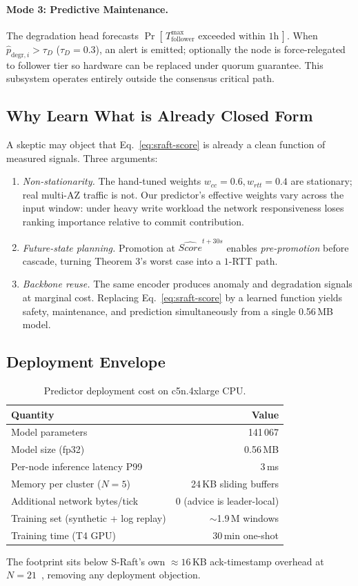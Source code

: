\paragraph{Mode 3: Predictive Maintenance.}
The degradation head forecasts $\Pr[\,T_{\mathrm{follower}}^{\max}\text{ exceeded within 1h}\,]$.
When $\widehat{p}_{\mathrm{degr},i}>\tau_D$ ($\tau_D=0.3$), an alert is
emitted; optionally the node is force-relegated to follower tier so
hardware can be replaced under quorum guarantee. This subsystem operates
entirely outside the consensus critical path.

\subsection{Why Learn What is Already Closed Form}

A skeptic may object that Eq.~\eqref{eq:sraft-score} is already a clean
function of measured signals. Three arguments:

\begin{enumerate}\setlength\itemsep{1pt}
\item[\textit{(i)}] \emph{Non-stationarity.} The hand-tuned weights
$w_{cc}=0.6, w_{rtt}=0.4$ are stationary; real multi-AZ traffic is not.
Our predictor's effective weights vary across the input window: under
heavy write workload the network responsiveness loses ranking importance
relative to commit contribution.
\item[\textit{(ii)}] \emph{Future-state planning.} Promotion at
$\widehat{Score}^{t+30s}$ enables \emph{pre-promotion} before cascade,
turning Theorem 3's worst case into a $1$-RTT path.
\item[\textit{(iii)}] \emph{Backbone reuse.} The same encoder produces
anomaly and degradation signals at marginal cost. Replacing
Eq.~\eqref{eq:sraft-score} by a learned function yields safety,
maintenance, and prediction simultaneously from a single 0.56\,MB model.
\end{enumerate}

\subsection{Deployment Envelope}

\begin{table}[h]
\centering
\caption{Predictor deployment cost on c5n.4xlarge CPU.}
\label{tab:predictor-cost}
\begin{tabular}{lr}
\toprule
Quantity & Value \\
\midrule
Model parameters & 141\,067 \\
Model size (fp32) & 0.56\,MB \\
Per-node inference latency P99 & 3\,ms \\
Memory per cluster ($N{=}5$) & 24\,KB sliding buffers \\
Additional network bytes/tick & 0 (advice is leader-local) \\
Training set (synthetic + log replay) & $\sim$1.9\,M windows \\
Training time (T4 GPU) & 30\,min one-shot \\
\bottomrule
\end{tabular}
\end{table}

The footprint sits below S-Raft's own $\approx 16$\,KB
ack-timestamp overhead at $N{=}21$~\cite[\S III-B]{Sraft2026}, removing
any deployment objection.
